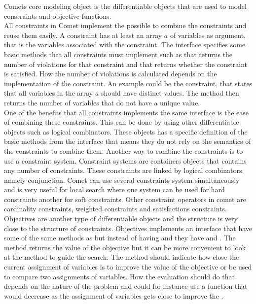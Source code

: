 Comets core modeling object is the differentiable objects that are used to model constraints and objective functions. \\
All constraints in Comet implement the %
possible to combine the constraints and reuse them easily. A constraint has at least an array $a$ of 
variables as argument, that is the variables associated with the constraint. The interface specifies some basic 
methods that all constraints must implement such as  that returns the number 
of violations for that constraint and  that returns whether the constraint is satisfied. How the number 
of violations is calculated depends on the implementation of the constraint. An example could be the 
 constraint, that states that all variables in the array $a$ should have distinct values. The 
method  then returns the number of variables that do not have a unique value. \medskip \\ 
One of the benefits that all constraints implements the same interface is the ease of combining these constraints. 
This can be done by using other differentiable objects such as logical combinators. These objects has a specific 
definition of the basic methods from the  interface that means they do not rely on the semantics 
of the constraints to combine them. 
Another way to combine the constraints is to use a constraint system. Constraint systems are containers objects that 
contains any number of constraints. These constraints are linked by logical combinators, namely conjunction. Comet can 
use several constraints system simultaneously and is very useful for local search where one system can be used for hard 
constraints another for soft constraints. Other constraint operators in comet are cardinality constraints, weighted 
constraints and satisfactions constraints. \medskip \\
Objectives are another type of differentiable objects and the structure is very close to the structure of constraints. 
Objectives implements an interface  that have some of the same methods as  
but instead of having  and  they have  and . 
The method  returns the value of the objective but it can be more convenient to look at the method 
 to guide the search. The method  should indicate how close the current 
assignment of variables is to 
improve the value of the objective or be used to compare two assignments of variables. How the evaluation should do 
that depends on the nature of the problem and could for instance use a function that would decrease as the assignment 
of variables gets close to improve the .
